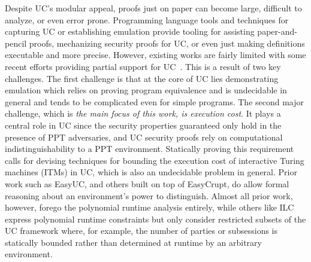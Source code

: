 Despite UC's modular appeal, proofs just on paper can become large, difficult to analyze, or even error prone. 
Programming language tools and techniques for capturing UC or establishing emulation provide tooling for assisting paper-and-pencil proofs, mechanizing security proofs for UC, or even just making definitions executable and more precise.
However, existing works are fairly limited with some recent efforts providing
partial support for UC~\cite{ilc,easyuc,ipdl,symbolicuc,barbosa}. This is a result of two key challenges.
The first challenge is that at the core of UC lies demonstrating emulation which relies on proving program equivalence and is undecidable in general
and tends to be complicated even for simple programs.
The second major challenge, which is \emph{the main focus of this work, is execution cost}. It plays a central role in UC since the security properties
guaranteed only hold in the presence of PPT adversaries, and UC security proofs rely on computational indistinguishability to a PPT environment. 
Statically proving this requirement calls for devising techniques for bounding the execution cost of interactive Turing machines (ITMs) in UC,
which is also an undecidable problem in general.
Prior work such as EasyUC, and others built on top of EasyCrupt, do allow formal reasoning about an environment's power to distinguish.
Almost all prior work, however, forego the polynomial runtime analysis entirely, while others like ILC express polynomial runtime constraints but only consider restricted subsets of the UC framework where, for example, the number of parties or subsessions is statically bounded rather than determined at runtime by an arbitrary environment.


